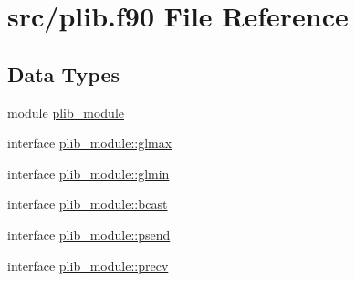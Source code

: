 \hypertarget{plib_8f90}{\section{src/plib.f90 File Reference}
\label{plib_8f90}
}
\subsection*{Data Types}
\begin{DoxyCompactItemize}
\item 
module \hyperlink{classplib__module}{plib\-\_\-module}
\item 
interface \hyperlink{interfaceplib__module_1_1glmax}{plib\-\_\-module\-::glmax}
\item 
interface \hyperlink{interfaceplib__module_1_1glmin}{plib\-\_\-module\-::glmin}
\item 
interface \hyperlink{interfaceplib__module_1_1bcast}{plib\-\_\-module\-::bcast}
\item 
interface \hyperlink{interfaceplib__module_1_1psend}{plib\-\_\-module\-::psend}
\item 
interface \hyperlink{interfaceplib__module_1_1precv}{plib\-\_\-module\-::precv}
\end{DoxyCompactItemize}
